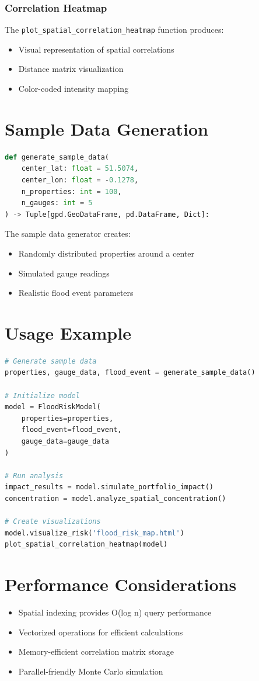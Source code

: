 \documentclass{article}
\begin{document}
\subsubsection{Correlation Heatmap}
The \texttt{plot\_spatial\_correlation\_heatmap} function produces:
\begin{itemize}
    \item Visual representation of spatial correlations
    \item Distance matrix visualization
    \item Color-coded intensity mapping
\end{itemize}

\section{Sample Data Generation}
\begin{lstlisting}[language=Python]
def generate_sample_data(
    center_lat: float = 51.5074,
    center_lon: float = -0.1278,
    n_properties: int = 100,
    n_gauges: int = 5
) -> Tuple[gpd.GeoDataFrame, pd.DataFrame, Dict]:
\end{lstlisting}

The sample data generator creates:
\begin{itemize}
    \item Randomly distributed properties around a center
    \item Simulated gauge readings
    \item Realistic flood event parameters
\end{itemize}

\section{Usage Example}
\begin{lstlisting}[language=Python]
# Generate sample data
properties, gauge_data, flood_event = generate_sample_data()

# Initialize model
model = FloodRiskModel(
    properties=properties,
    flood_event=flood_event,
    gauge_data=gauge_data
)

# Run analysis
impact_results = model.simulate_portfolio_impact()
concentration = model.analyze_spatial_concentration()

# Create visualizations
model.visualize_risk('flood_risk_map.html')
plot_spatial_correlation_heatmap(model)
\end{lstlisting}

\section{Performance Considerations}
\begin{itemize}
    \item Spatial indexing provides O(log n) query performance
    \item Vectorized operations for efficient calculations
    \item Memory-efficient correlation matrix storage
    \item Parallel-friendly Monte Carlo simulation
\end{itemize}
\end{document}
